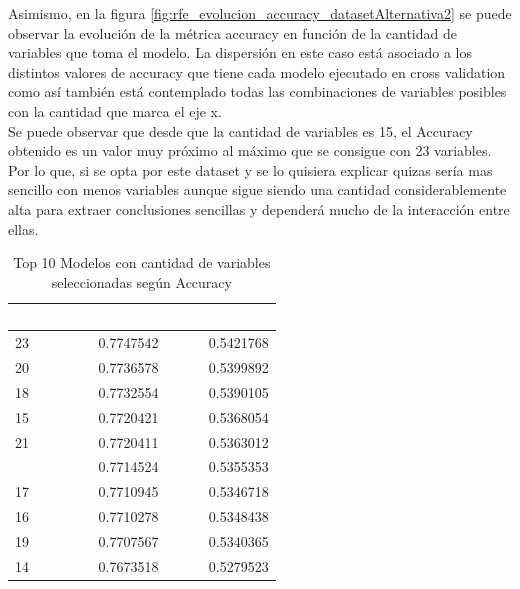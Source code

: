 Asimismo, en la figura \ref{fig:rfe_evolucion_accuracy_datasetAlternativa2} se puede observar la evolución de la métrica accuracy en función de la cantidad de variables que toma el modelo. La dispersión en este caso está asociado a los distintos valores de accuracy que tiene cada modelo ejecutado en cross validation como así también está contemplado todas las combinaciones de variables posibles con la cantidad que marca el eje x.\\
Se puede observar que desde que la cantidad de variables es 15, el Accuracy obtenido es un valor muy próximo al máximo que se consigue con 23 variables. Por lo que, si se opta por este dataset y se lo quisiera explicar quizas sería mas sencillo con menos variables aunque sigue siendo una cantidad considerablemente alta para extraer conclusiones sencillas y dependerá mucho de la interacción entre ellas.\\


\begin{table}[!h]
	
	\caption{\label{tab:top_10_rfe_accuracy_datasetAlternativa2}Top 10 Modelos con cantidad de variables seleccionadas según Accuracy}
	\centering
	\begin{tabular}[t]{rrr}
		\toprule
		\rowcolor{black}  \multicolumn{1}{c}{\textcolor{white}{\textbf{Variables}}} & \multicolumn{1}{c}{\textcolor{white}{\textbf{media\_accuracy}}} & \multicolumn{1}{c}{\textcolor{white}{\textbf{media\_kappa}}}\\
		\midrule
		\rowcolor{gray!6}  23 & 0.7747542 & 0.5421768\\
		20 & 0.7736578 & 0.5399892\\
		\rowcolor{gray!6}  18 & 0.7732554 & 0.5390105\\
		15 & 0.7720421 & 0.5368054\\
		\rowcolor{gray!6}  21 & 0.7720411 & 0.5363012\\
		\addlinespace
		22 & 0.7714524 & 0.5355353\\
		\rowcolor{gray!6}  17 & 0.7710945 & 0.5346718\\
		16 & 0.7710278 & 0.5348438\\
		\rowcolor{gray!6}  19 & 0.7707567 & 0.5340365\\
		14 & 0.7673518 & 0.5279523\\
		\bottomrule
	\end{tabular}
\end{table}

